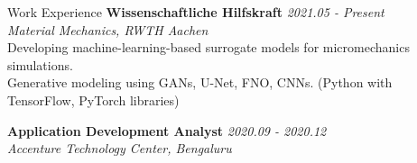 \documentclass{resume}
\begin{document}
\begin{rSection}{Work Experience}
{\bf Wissenschaftliche Hilfskraft} \hfill {\em 2021.05 - Present}\\
{\em Material Mechanics, RWTH Aachen}\\
Developing machine-learning-based surrogate models for micromechanics simulations. \\Generative modeling using GANs, U-Net, FNO, CNNs. (Python with TensorFlow, PyTorch libraries)

{\bf Application Development Analyst} \hfill {\em 2020.09 - 2020.12}\\
{\em Accenture Technology Center, Bengaluru}
\end{rSection}
\end{document}
